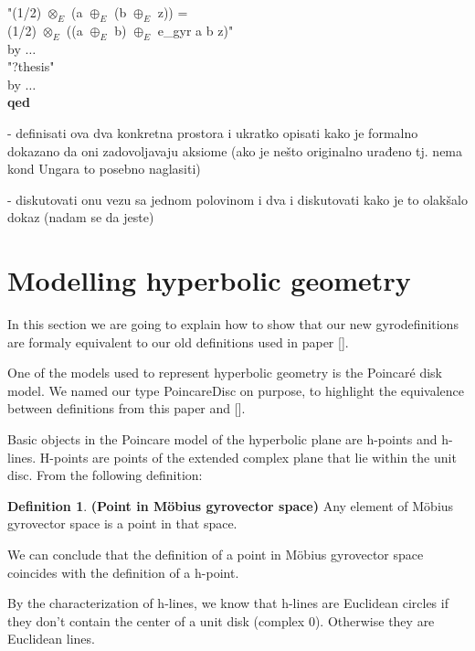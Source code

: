 \documentclass[a4paper]{article}
\newcommand{\tab}{\hspace{5mm}}
\theoremstyle{definition}
\newtheorem{definition}{Definition}[section]
\begin{document}
{\begin{footnotesize}
\begin{tabbing}
\tab {\bf moreover have} "(1/2) $\otimes_E$ (a $\oplus_E$ (b $\oplus_E$ z)) = \\ \tab \tab (1/2)  $\otimes_E$ ((a $\oplus_E$ b) $\oplus_E$ e\_gyr a b z)" 
\\ \tab \tab by $\ldots$\\

\tab {\bf ultimately show} "?thesis"\\
\tab \tab by $\ldots$\\
{\bf qed}\\
\end{tabbing}
\end{footnotesize}
}









- definisati ova dva konkretna prostora i ukratko opisati kako je
formalno dokazano da oni zadovoljavaju aksiome (ako je nešto
originalno urađeno tj. nema kond Ungara to posebno naglasiti)

- diskutovati onu vezu sa jednom polovinom i dva i diskutovati kako je to olakšalo dokaz (nadam se da jeste)

\section{Modelling hyperbolic geometry}\label{sec:models}

In this section we are going to explain how to show that our new gyrodefinitions are formaly equivalent to our old definitions used in paper [].

One of the models used to represent hyperbolic geometry is the Poincar\'{e} disk model. We named our type PoincareDisc on purpose, to highlight the equivalence between definitions from this paper and [].

Basic objects in the Poincare model of the hyperbolic plane are h-points and h-lines. H-points are points of the extended complex plane that lie within the unit disc. From the following definition:
\begin{definition}\textbf{(Point in M\" obius gyrovector space)} Any element of M\" obius gyrovector space is a point in that space.
\end{definition}

We can conclude that the definition of a point in M\" obius gyrovector space coincides with the definition of a h-point.

By the characterization of h-lines, we know that h-lines are Euclidean circles if they don't contain the center of a unit disk (complex $0$). Otherwise they are Euclidean lines.
\end{document}
